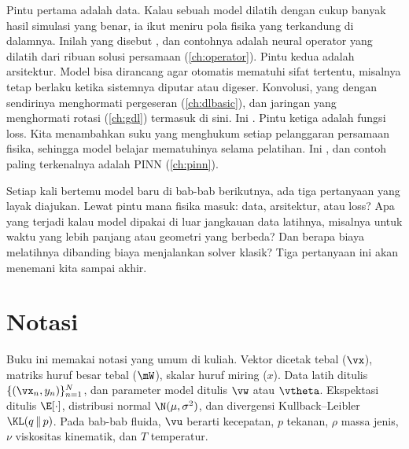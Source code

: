 Pintu pertama adalah data. Kalau sebuah model dilatih dengan cukup banyak hasil simulasi yang
benar, ia ikut meniru pola fisika yang terkandung di dalamnya. Inilah yang disebut
, dan contohnya adalah neural operator yang dilatih dari ribuan solusi
persamaan (\cref{ch:operator}). Pintu kedua adalah arsitektur. Model bisa dirancang agar
otomatis mematuhi sifat tertentu, misalnya tetap berlaku ketika sistemnya diputar atau digeser.
Konvolusi, yang dengan sendirinya menghormati pergeseran (\cref{ch:dlbasic}), dan jaringan yang
menghormati rotasi (\cref{ch:gdl}) termasuk di sini. Ini . Pintu ketiga
adalah fungsi loss. Kita menambahkan suku yang menghukum setiap pelanggaran persamaan fisika,
sehingga model belajar mematuhinya selama pelatihan. Ini , dan contoh
paling terkenalnya adalah PINN (\cref{ch:pinn}).

Setiap kali bertemu model baru di bab-bab berikutnya, ada tiga pertanyaan yang layak diajukan.
Lewat pintu mana fisika masuk: data, arsitektur, atau loss? Apa yang terjadi kalau model
dipakai di luar jangkauan data latihnya, misalnya untuk waktu yang lebih panjang atau geometri
yang berbeda? Dan berapa biaya melatihnya dibanding biaya menjalankan solver klasik? Tiga
pertanyaan ini akan menemani kita sampai akhir.

\section{Notasi}

Buku ini memakai notasi yang umum di kuliah. Vektor dicetak tebal ($\vx$), matriks huruf
besar tebal ($\mW$), skalar huruf miring ($x$). Data latih ditulis $\{(\vx_n,y_n)\}_{n=1}^N$,
dan parameter model ditulis $\vw$ atau $\vtheta$. Ekspektasi ditulis $\E[\cdot]$, distribusi
normal $\N(\mu,\sigma^2)$, dan divergensi Kullback--Leibler $\KL(q\,\|\,p)$. Pada bab-bab
fluida, $\vu$ berarti kecepatan, $p$ tekanan, $\rho$ massa jenis, $\nu$ viskositas kinematik,
dan $T$ temperatur.
